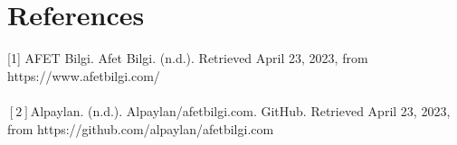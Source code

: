 \chapter{References}

[1] AFET Bilgi. Afet Bilgi. (n.d.). Retrieved April 23, 2023, from https://www.afetbilgi.com/ \\~\\
$[2]$Alpaylan. (n.d.). Alpaylan/afetbilgi.com. GitHub. Retrieved April 23, 2023, from https://github.com/alpaylan/afetbilgi.com 
